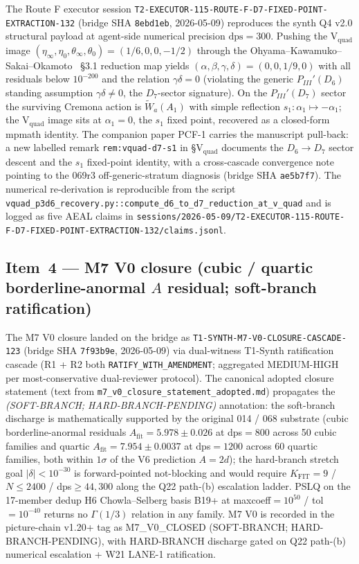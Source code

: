 \documentclass[11pt,a4paper]{article}
\theoremstyle{definition}
\theoremstyle{remark}
\begin{document}
The Route F executor session
\texttt{T2-EXECUTOR-115-ROUTE-F-D7-FIXED-POINT-EXTRACTION-132}
(bridge SHA \texttt{8ebd1eb}, 2026-05-09) reproduces the synth
Q4 v2.0 structural payload at agent-side numerical precision
$\mathrm{dps} = 300$. Pushing the V$_{\mathrm{quad}}$ image
$(\eta_\infty, \eta_0, \theta_\infty, \theta_0) = (1/6, 0, 0, -1/2)$
through the Ohyama--Kawamuko--Sakai--Okamoto~\cite{Ohyama2006}
\S 3.1 reduction map yields
$(\alpha, \beta, \gamma, \delta) = (0, 0, 1/9, 0)$ with all
residuals below $10^{-200}$ and the relation
$\gamma\delta = 0$ (violating the generic $P_{III}'(D_6)$ standing
assumption $\gamma\delta \neq 0$, the $D_7$-sector signature). On
the $P_{III}'(D_7)$ sector the surviving Cremona action is
$\widetilde{W}_a(A_1)$ with simple reflection
$s_1: \alpha_1 \mapsto -\alpha_1$; the V$_{\mathrm{quad}}$ image
sits at $\alpha_1 = 0$, the $s_1$ fixed point, recovered as a
closed-form mpmath identity. The companion paper PCF-1
\cite{PCF1} carries the manuscript pull-back: a new labelled
remark \verb|rem:vquad-d7-s1| in \cite{PCF1} \S V$_{\mathrm{quad}}$
documents the $D_6 \to D_7$ sector descent and the $s_1$ fixed-point
identity, with a cross-cascade convergence note pointing to the
069r3 off-generic-stratum diagnosis (bridge SHA \texttt{ae5b7f7}).
The numerical re-derivation is reproducible from the script
\texttt{vquad\_p3d6\_recovery.py::compute\_d6\_to\_d7\_reduction\_at\_v\_quad}
and is logged as five AEAL claims in
\texttt{sessions/2026-05-09/T2-EXECUTOR-115-ROUTE-F-D7-FIXED-POINT-EXTRACTION-132/claims.jsonl}.

\subsection{Item~4 --- M7 V0 closure (cubic / quartic borderline-anormal $A$ residual; soft-branch ratification)}
\label{sec:closure-cascade-m7}

The M7 V0 closure landed on the bridge as
\texttt{T1-SYNTH-M7-V0-CLOSURE-CASCADE-123} (bridge SHA \texttt{7f93b9e},
2026-05-09) via dual-witness T1-Synth ratification cascade (R1 + R2
both \verb|RATIFY_WITH_AMENDMENT|; aggregated MEDIUM-HIGH per
most-conservative dual-reviewer protocol). The canonical adopted
closure statement (text from
\texttt{m7\_v0\_closure\_statement\_adopted.md}) propagates the
\emph{(SOFT-BRANCH; HARD-BRANCH-PENDING)} annotation: the soft-branch
discharge is mathematically supported by the original 014 / 068
substrate (cubic borderline-anormal residuals
$A_{\mathrm{fit}} = 5.978 \pm 0.026$ at dps$=800$ across 50 cubic
families and quartic $A_{\mathrm{fit}} = 7.954 \pm 0.0037$ at
dps$=1200$ across 60 quartic families, both within $1\sigma$ of the
V6 prediction $A=2d$); the hard-branch stretch goal $|\delta| < 10^{-30}$
is forward-pointed not-blocking and would require $K_{\mathrm{FIT}}=9$ /
$N \leq 2400$ / dps$\geq 44{,}300$ along the Q22 path-(b) escalation
ladder. PSLQ on the 17-member dedup H6 Chowla--Selberg basis B19+ at
maxcoeff$=10^{50}$ / tol$=10^{-40}$ returns no $\Gamma(1/3)$ relation
in any family. M7 V0 is recorded in the picture-chain v1.20+ tag as
\textsf{M7\_V0\_CLOSED (SOFT-BRANCH; HARD-BRANCH-PENDING)}, with
HARD-BRANCH discharge gated on Q22 path-(b) numerical escalation +
W21 LANE-1 ratification.
\end{document}
